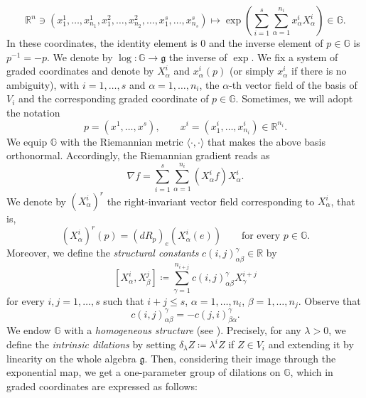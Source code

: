 \documentclass[11pt]{amsart}
\newcommand{\rr}{\mathbb R}
\theoremstyle{plain}
\theoremstyle{definition}
\theoremstyle{remark}
\numberwithin{equation}{section}
\begin{document}
\begin{equation*}
\rr^n \ni \left(x^1_1,\dots,x^1_{n_1},x^2_1,\dots,x^2_{n_2},\dots,x^s_1,\dots,x^s_{n_s}\right) \mapsto \exp\left(\sum_{i=1}^s \sum_{\alpha=1}^{n_i} x^i_\alpha X^i_\alpha\right) \in \mathbb{G}.
\end{equation*}
In these coordinates, the identity element is $0$ and the inverse element of $p \in \mathbb{G}$ is $p^{-1}=-p$. We denote by $\log : \mathbb{G} \to \mathfrak{g}$ the inverse of $\exp$. We fix a system of graded coordinates and denote by $X^i_\alpha$ and $x^i_\alpha(p)$ (or simply $x^i_\alpha$ if there is no ambiguity), with $i=1,\dots,s$ and $\alpha=1,\dots,n_i$, the $\alpha$-th vector field of the basis of $V_i$ and the corresponding graded coordinate of $p \in \mathbb{G}$. Sometimes, we will adopt the notation
\begin{equation*}
p=\left(x^1,\dots,x^s\right), \qquad x^i=\left(x^i_1,\dots,x^i_{n_i}\right) \in \rr^{n_i}.
\end{equation*}
We equip $\mathbb{G}$ with the Riemannian metric $\langle \cdot, \cdot \rangle$ that makes the above basis orthonormal. Accordingly, the Riemannian gradient reads as
\begin{equation*}
\nabla f =\sum_{i=1}^s\sum_{\alpha=1}^{n_i}\left(X^i_\alpha f\right) X^i_\alpha.
\end{equation*}
We denote by $\left(X^i_\alpha \right)^r$ the right-invariant vector field corresponding to $X^i_\alpha$, that is,
\begin{equation*}
\left(X^i_\alpha \right)^r(p)=\left(dR_p\right)_e\left(X^i_\alpha(e)\right) \qquad \text{for every $p \in \mathbb{G}$.}
\end{equation*}
Moreover, we define the \emph{structural constants} $c(i,j)^\gamma_{\alpha \beta} \in \rr$ by
\begin{equation} \label{eq_structural_constants}
\left[X^i_\alpha,X^j_\beta\right] \coloneqq \sum_{\gamma=1}^{n_{i+j}} c(i,j)^\gamma_{\alpha \beta} X^{i+j}_\gamma
\end{equation}
for every $i,j=1,\dots,s$ such that $i+j \leq s$, $\alpha=1,\dots,n_i$, $\beta=1,\dots,n_j$. Observe that
\begin{equation} \label{eq_skew_structural_constants}
c(i,j)_{\alpha \beta}^\gamma = - c(j,i)_{\beta \alpha}^\gamma.
\end{equation}
We endow $\mathbb{G}$ with a \emph{homogeneous structure} (see \cite{BonLanUgu}). Precisely, for any $\lambda>0$, we define the \emph{intrinsic dilations} by setting $\delta_\lambda Z \coloneqq \lambda^i Z$ if $Z \in V_i$ and extending it by linearity on the whole algebra $\mathfrak{g}$. Then, considering their image through the exponential map, we get a one-parameter group of dilations on $\mathbb{G}$, which in graded coordinates are expressed as follows:
\end{document}
